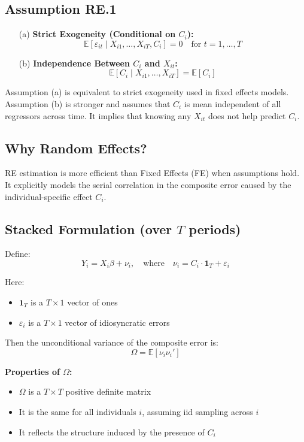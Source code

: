 \documentclass[12pt, oneside]{article}
\begin{document}
\subsection*{Assumption RE.1}

\begin{itemize}
    \item[(a)] \textbf{Strict Exogeneity (Conditional on \( C_i \)):}
    \[
    \mathbb{E}[\varepsilon_{it} \mid X_{i1}, \dots, X_{iT}, C_i] = 0 \quad \text{for } t = 1, \dots, T
    \]

    \item[(b)] \textbf{Independence Between \( C_i \) and \( X_{it} \):}
    \[
    \mathbb{E}[C_i \mid X_{i1}, \dots, X_{iT}] = \mathbb{E}[C_i]
    \]
\end{itemize}

Assumption (a) is equivalent to strict exogeneity used in fixed effects models. Assumption (b) is stronger and assumes that \( C_i \) is mean independent of all regressors across time. It implies that knowing any \( X_{it} \) does not help predict \( C_i \).

\subsection*{Why Random Effects?}

RE estimation is more efficient than Fixed Effects (FE) when assumptions hold. It explicitly models the serial correlation in the composite error caused by the individual-specific effect \( C_i \).

\subsection*{Stacked Formulation (over \( T \) periods)}

Define:
\[
Y_i = X_i \beta + \nu_i, \quad \text{where} \quad \nu_i = C_i \cdot \mathbf{1}_T + \varepsilon_i
\]

Here:
\begin{itemize}
    \item \( \mathbf{1}_T \) is a \( T \times 1 \) vector of ones
    \item \( \varepsilon_i \) is a \( T \times 1 \) vector of idiosyncratic errors
\end{itemize}

Then the unconditional variance of the composite error is:
\[
\Omega = \mathbb{E}[\nu_i \nu_i']
\]

\noindent
\textbf{Properties of \( \Omega \):}
\begin{itemize}
    \item \( \Omega \) is a \( T \times T \) positive definite matrix
    \item It is the same for all individuals \( i \), assuming iid sampling across \( i \)
    \item It reflects the structure induced by the presence of \( C_i \)
\end{itemize}
\end{document}
